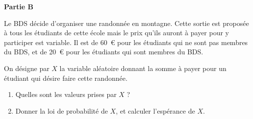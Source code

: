 \medskip

\textbf{Partie B}

\medskip

Le BDS décide d'organiser une randonnée en montagne. Cette sortie est proposée à tous les étudiants de cette école mais le prix qu'ils auront à payer pour y participer est variable. Il est de 60~\euro{} pour les étudiants qui ne sont pas membres du BDS, et de 20~\euro{} pour les étudiants qui sont membres du BDS.

On désigne par $X$ la variable aléatoire donnant la somme à payer pour un étudiant qui désire
faire cette randonnée.

\begin{enumerate}
\item Quelles sont les valeurs prises par $X$ ?
\item Donner la loi de probabilité de $X$, et calculer l'espérance de $X$.
\end{enumerate}

\vspace{0,5cm}
